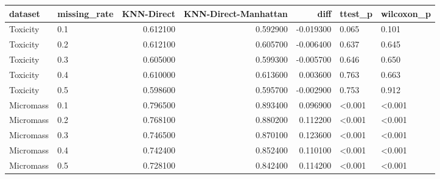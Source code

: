 \begin{tabular}{llrrrll}
\toprule
dataset & missing_rate & KNN-Direct & KNN-Direct-Manhattan & diff & ttest_p & wilcoxon_p \\
\midrule
Toxicity & 0.1 & 0.612100 & 0.592900 & -0.019300 & 0.065 & 0.101 \\
Toxicity & 0.2 & 0.612100 & 0.605700 & -0.006400 & 0.637 & 0.645 \\
Toxicity & 0.3 & 0.605000 & 0.599300 & -0.005700 & 0.646 & 0.650 \\
Toxicity & 0.4 & 0.610000 & 0.613600 & 0.003600 & 0.763 & 0.663 \\
Toxicity & 0.5 & 0.598600 & 0.595700 & -0.002900 & 0.753 & 0.912 \\
Micromass & 0.1 & 0.796500 & 0.893400 & 0.096900 & <0.001 & <0.001 \\
Micromass & 0.2 & 0.768100 & 0.880200 & 0.112200 & <0.001 & <0.001 \\
Micromass & 0.3 & 0.746500 & 0.870100 & 0.123600 & <0.001 & <0.001 \\
Micromass & 0.4 & 0.742400 & 0.852400 & 0.110100 & <0.001 & <0.001 \\
Micromass & 0.5 & 0.728100 & 0.842400 & 0.114200 & <0.001 & <0.001 \\
\bottomrule
\end{tabular}

